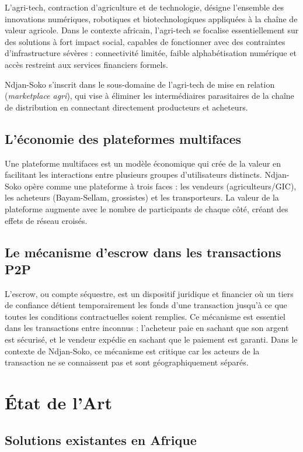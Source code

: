 \documentclass[12pt,a4paper]{report}
\begin{document}
L'agri-tech, contraction d'agriculture et de technologie, désigne l'ensemble des innovations numériques, robotiques et biotechnologiques appliquées à la chaîne de valeur agricole. Dans le contexte africain, l'agri-tech se focalise essentiellement sur des solutions à fort impact social, capables de fonctionner avec des contraintes d'infrastructure sévères : connectivité limitée, faible alphabétisation numérique et accès restreint aux services financiers formels.

Ndjan-Soko s'inscrit dans le sous-domaine de l'agri-tech de mise en relation (\textit{marketplace agri}), qui vise à éliminer les intermédiaires parasitaires de la chaîne de distribution en connectant directement producteurs et acheteurs.

\subsection{L'économie des plateformes multifaces}

Une plateforme multifaces est un modèle économique qui crée de la valeur en facilitant les interactions entre plusieurs groupes d'utilisateurs distincts. Ndjan-Soko opère comme une plateforme à trois faces : les vendeurs (agriculteurs/GIC), les acheteurs (Bayam-Sellam, grossistes) et les transporteurs. La valeur de la plateforme augmente avec le nombre de participants de chaque côté, créant des effets de réseau croisés.

\subsection{Le mécanisme d'escrow dans les transactions P2P}

L'escrow, ou compte séquestre, est un dispositif juridique et financier où un tiers de confiance détient temporairement les fonds d'une transaction jusqu'à ce que toutes les conditions contractuelles soient remplies. Ce mécanisme est essentiel dans les transactions entre inconnus : l'acheteur paie en sachant que son argent est sécurisé, et le vendeur expédie en sachant que le paiement est garanti. Dans le contexte de Ndjan-Soko, ce mécanisme est critique car les acteurs de la transaction ne se connaissent pas et sont géographiquement séparés.

\section{État de l'Art}

\subsection{Solutions existantes en Afrique}
\end{document}
